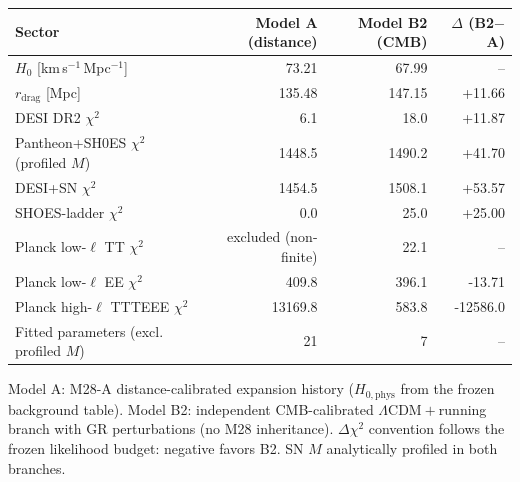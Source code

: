 \begin{tabular}{lrrr}
\toprule
Sector & Model A (distance) & Model B2 (CMB) & $\Delta$ (B2$-$A) \\
\midrule
$H_{0}$ [km\,s$^{-1}$\,Mpc$^{-1}$] & 73.21 & 67.99 & -- \\
$r_{\mathrm{drag}}$ [Mpc] & 135.48 & 147.15 & +11.66 \\
DESI DR2 $\chi^{2}$ & 6.1 & 18.0 & +11.87 \\
Pantheon+SH0ES $\chi^{2}$ (profiled $M$) & 1448.5 & 1490.2 & +41.70 \\
DESI+SN $\chi^{2}$ & 1454.5 & 1508.1 & +53.57 \\
SHOES-ladder $\chi^{2}$ & 0.0 & 25.0 & +25.00 \\
Planck low-$\ell$ TT $\chi^{2}$ & excluded (non-finite) & 22.1 & -- \\
Planck low-$\ell$ EE $\chi^{2}$ & 409.8 & 396.1 & -13.71 \\
Planck high-$\ell$ TTTEEE $\chi^{2}$ & 13169.8 & 583.8 & -12586.0 \\
Fitted parameters (excl. profiled $M$) & 21 & 7 & -- \\
\bottomrule
\end{tabular}

{\small Model A: M28-A distance-calibrated expansion history ($H_{0,\mathrm{phys}}$ from the frozen background table). Model B2: independent CMB-calibrated $\Lambda$CDM${}+{}$running branch with GR perturbations (no M28 inheritance). $\Delta\chi^{2}$ convention follows the frozen likelihood budget: negative favors B2. SN $M$ analytically profiled in both branches.\par}
